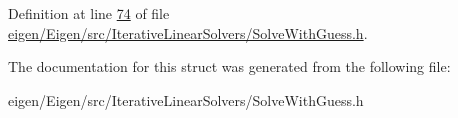 Definition at line \hyperlink{eigen_2_eigen_2src_2_iterative_linear_solvers_2_solve_with_guess_8h_source_l00074}{74} of file \hyperlink{eigen_2_eigen_2src_2_iterative_linear_solvers_2_solve_with_guess_8h_source}{eigen/\+Eigen/src/\+Iterative\+Linear\+Solvers/\+Solve\+With\+Guess.\+h}.



The documentation for this struct was generated from the following file\+:\begin{DoxyCompactItemize}
\item 
eigen/\+Eigen/src/\+Iterative\+Linear\+Solvers/\+Solve\+With\+Guess.\+h\end{DoxyCompactItemize}
